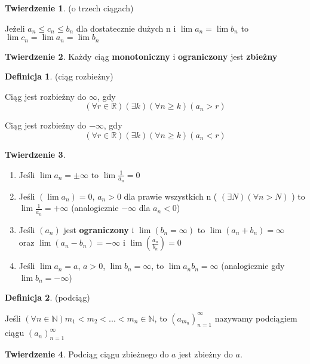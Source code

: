 \documentclass{article}
\theoremstyle{definition}
\newtheorem{de}{Definicja}[subsection]
\theoremstyle{definition}
\newtheorem{tw}{Twierdzenie}[subsection]
\theoremstyle{definition}
\begin{document}
\begin{tw}
(o trzech ciągach)

Jeżeli $ a_n \leq c_n \leq b_n $ dla dostatecznie dużych n i 
$ \lim a_n = \lim b_n $ to
$ \lim c_n = \lim a_n = \lim b_n $
\end{tw}

\begin{tw}
Każdy ciąg \textbf{monotoniczny} i \textbf{ograniczony}
jest \textbf{zbieżny}
\end{tw}

\begin{de}
(ciąg rozbieżny)

Ciąg jest rozbieżny do $ \infty $, gdy
$$
(\forall r \in \mathbb{R})(\exists k)(\forall n \geq k)(a_n > r)
$$

Ciąg jest rozbieżny do $ -\infty $, gdy
$$
(\forall r \in \mathbb{R})(\exists k)(\forall n \geq k)(a_n < r)
$$
\end{de}

\begin{tw}
\
\begin{enumerate}
\item Jeśli $ \lim a_n = \pm \infty $ to 
      $ \lim \frac{1}{a_n} = 0 $
\item Jeśli $(\lim a_n) = 0$, $a_n > 0$ dla prawie wszystkich n
      ( $ (\exists N) (\forall n>N) $ )
      to $ \lim \frac{1}{a_n} = + \infty $
      (analogicznie $-\infty$ dla $a_n < 0$)
\item Jeśli $(a_n)$ jest \textbf{ograniczony} i
      $ \lim (b_n = \infty) $
      to $ \lim (a_n + b_n) = \infty $\\
      oraz $ \lim (a_n - b_n) = - \infty $
      i $ \lim (\frac{a_n}{b_n}) = 0 $
\item Jeśli $ \lim a_n = a $, $a>0$, $ \lim b_n = \infty $,
      to $ \lim a_n b_n = \infty $
      (analogicznie gdy $\lim b_n = - \infty $)
\end{enumerate}
\end{tw}

\begin{de}
(podciąg)

Jeśli $ (\forall n \in \mathbb{N}) m_1<m_2<...<m_n \in \mathbb{N} $,
to $ (a_{m_n})_{n=1}^{\infty} $
nazywamy podciągiem ciągu $ (a_n)_{n=1}^{\infty} $
\end{de}

\begin{tw}
Podciąg ciągu zbieżnego do $a$ jest zbieżny do $a$.
\end{tw}
\end{document}
